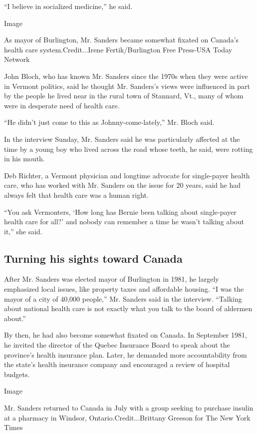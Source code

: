 ``I believe in socialized medicine,'' he said.

Image

As mayor of Burlington, Mr. Sanders became somewhat fixated on Canada's
health care system.Credit...Irene Fertik/Burlington Free Press-USA Today
Network

John Bloch, who has known Mr. Sanders since the 1970s when they were
active in Vermont politics, said he thought Mr. Sanders's views were
influenced in part by the people he lived near in the rural town of
Stannard, Vt., many of whom were in desperate need of health care.

``He didn't just come to this as Johnny-come-lately,'' Mr. Bloch said.

In the interview Sunday, Mr. Sanders said he was particularly affected
at the time by a young boy who lived across the road whose teeth, he
said, were rotting in his mouth.

Deb Richter, a Vermont physician and longtime advocate for single-payer
health care, who has worked with Mr. Sanders on the issue for 20 years,
said he had always felt that health care was a human right.

``You ask Vermonters, `How long has Bernie been talking about
single-payer health care for all?' and nobody can remember a time he
wasn't talking about it,'' she said.

\hypertarget{turning-his-sights-toward-canada}{%
\subsection{Turning his sights toward
Canada}\label{turning-his-sights-toward-canada}}

After Mr. Sanders was elected mayor of Burlington in 1981, he largely
emphasized local issues, like property taxes and affordable housing. ``I
was the mayor of a city of 40,000 people,'' Mr. Sanders said in the
interview. ``Talking about national health care is not exactly what you
talk to the board of aldermen about.''

By then, he had also become somewhat fixated on Canada. In September
1981, he invited the director of the Quebec Insurance Board to speak
about the province's health insurance plan. Later, he demanded more
accountability from the state's health insurance company and encouraged
a review of hospital budgets.

Image

Mr. Sanders returned to Canada in July with a group seeking to purchase
insulin at a pharmacy in Windsor, Ontario.Credit...Brittany Greeson for
The New York Times

